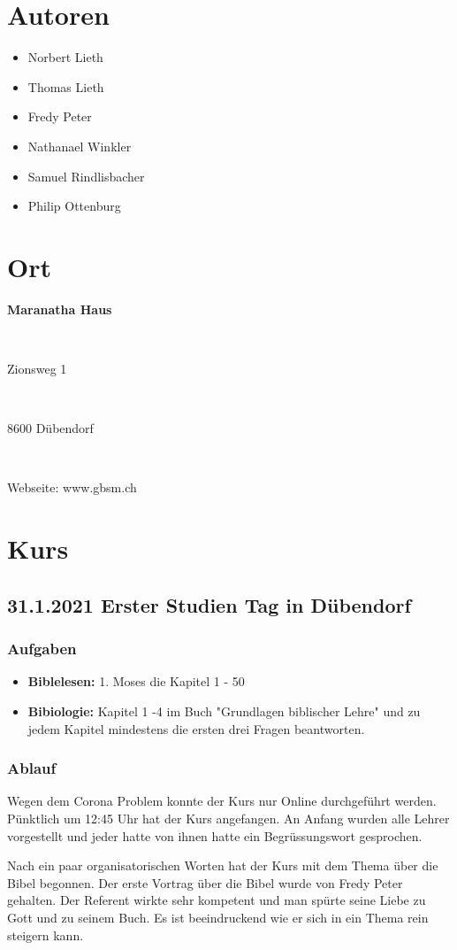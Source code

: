\section{Autoren}
\begin{itemize}
    \item Norbert Lieth
    \item Thomas Lieth
    \item Fredy Peter
    \item Nathanael Winkler
    \item Samuel Rindlisbacher
    \item Philip Ottenburg 
\end{itemize}
\section{Ort}
\parbox{3.5in}{\textbf{Maranatha Haus}}\\
\parbox{3.5in}{Zionsweg 1} \\
\parbox{3.5in}{8600 Dübendorf} \\
\parbox{3.5in}{Webseite: www.gbsm.ch}
\newpage
\section{Kurs}
\subsection{31.1.2021 Erster Studien Tag in Dübendorf}
\subsubsection{Aufgaben}
\begin{itemize}
    \item \textbf{Biblelesen:} 1. Moses die Kapitel 1 - 50
    \item \textbf{Bibiologie:} Kapitel 1 -4 im Buch "Grundlagen biblischer Lehre" 
    \cite{bibli:1} und zu jedem Kapitel mindestens die ersten drei Fragen beantworten. 
\end{itemize}
\subsubsection{Ablauf}
Wegen dem Corona Problem konnte der Kurs nur Online durchgeführt werden. Pünktlich um 12:45 Uhr hat der Kurs angefangen. An Anfang wurden alle Lehrer vorgestellt und jeder hatte von ihnen hatte ein Begrüssungswort gesprochen.

Nach ein paar organisatorischen Worten hat der Kurs mit dem Thema über die Bibel begonnen. Der erste Vortrag über die Bibel wurde von Fredy Peter gehalten. Der Referent wirkte sehr kompetent und man spürte seine Liebe zu Gott und zu seinem Buch. Es ist beeindruckend wie er sich in ein Thema rein steigern kann.

